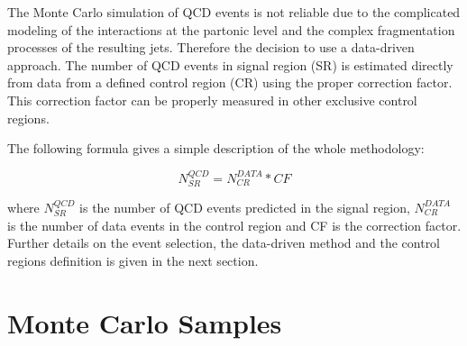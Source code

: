 The Monte Carlo simulation of QCD events is not reliable due to the complicated modeling of the interactions at the partonic level and the complex fragmentation processes of the resulting jets. Therefore the decision to use a data-driven approach. The number of QCD events in signal region (SR) is estimated directly from data from a defined control region (CR) using the proper correction factor. This correction factor can be properly measured in other exclusive control regions. 

The following formula gives a simple description of the whole methodology:

\begin{equation}
N^{QCD}_{SR} =  N^{DATA}_{CR} * CF
\label{eq:qcdbgpred_simple}
\end{equation} 

where $N^{QCD}_{SR}$ is the number of QCD events predicted in the signal region, $N^{DATA}_{CR}$ is the number of data events in the control region and CF is the correction factor. Further details on the event selection, the data-driven method and the control regions definition is given in the next section.

\clearpage

\section{Monte Carlo Samples}


